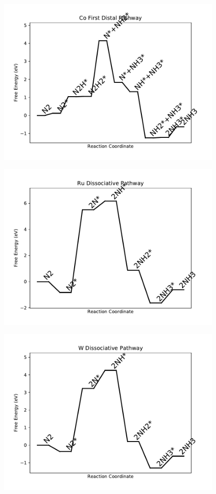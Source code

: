 \begin{figure}
\includegraphics[width=0.8\linewidth]{data/plots/Co_distal_1.pdf}
\label{fig:Co_distal_1}
\end{figure}

\begin{figure}
\includegraphics[width=0.8\linewidth]{data/plots/Ru_dissociative.pdf}
\label{fig:Ru_dissociative}
\end{figure}

\begin{figure}
\includegraphics[width=0.8\linewidth]{data/plots/W_dissociative.pdf}
\label{fig:W_dissociative}
\end{figure}

